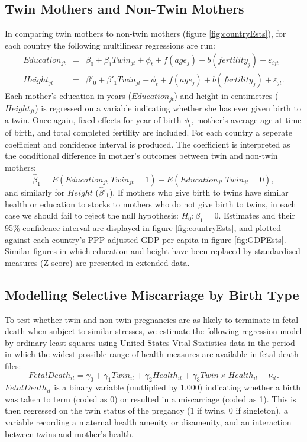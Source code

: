 \documentclass{nature}
\begin{document}
\begin{linenumbers}
\subsection{Twin Mothers and Non-Twin Mothers}
In comparing twin mothers to non-twin mothers (figure \ref{fig:countryEsts}), for each country the following multilinear regressions are run:
\begin{eqnarray}
  Education_{jt}&=&\beta_0 + \beta_1 Twin_{jt} + \phi_t + f(age_j) + b(fertility_j) + \varepsilon_{ijt} \\
  Height_{jt}&=&\beta'_0 + \beta'_1 Twin_{jt} + \phi_t + f(age_j) + b(fertility_j) + \varepsilon_{jt}.
\end{eqnarray}
Each mother's education in years ($Education_{jt}$) and height in centimetres ($Height_{jt}$) is regressed on a variable indicating whether she has ever given birth to a twin.  Once again, fixed effects for year of birth $\phi_t$, mother's average age at time of birth, and total completed fertility are included.  For each country a seperate coefficient and confidence interval is produced.  The coefficient is interpreted as the conditional difference in mother's outcomes between twin and non-twin mothers:
\[
\hat\beta_1 = E(Education_{jt}| Twin_{jt}=1) - E(Education_{jt}| Twin_{jt}=0),
\]
and similarly for $Height$ ($\hat\beta'_1$).  If mothers who give birth to twins have similar health or education to stocks to mothers who do not give birth to twins, in each case we should fail to reject the null hypothesis: $H_0: \beta_1=0$.  Estimates and their 95\% confidence interval are displayed in figure \ref{fig:countryEsts}, and plotted against each country's PPP adjusted GDP per capita in figure \ref{fig:GDPEsts}.  Similar figures in which education and height have been replaced by standardised measures (Z-score) are presented in extended data.

\subsection{Modelling Selective Miscarriage by Birth Type}
To test whether twin and non-twin pregnancies are as likely to terminate in fetal death when subject to similar stresses, we estimate the following regression model by ordinary least squares using United States Vital Statistics data in the period in which the widest possible range of health measures are available in fetal death files:
\begin{equation}
FetalDeath_{it} = \gamma_0 + \gamma_1 Twin_{it} + \gamma_2 Health_{it} + \gamma_3 Twin\times Health_{it} + \nu_{it}.
\end{equation}
$FetalDeath_{it}$ is a binary variable (mutliplied by 1,000) indicating whether a birth was taken to term (coded as 0) or resulted in a miscarriage (coded as 1).  This is then regressed on the twin status of the pregancy (1 if twins, 0 if singleton), a variable recording a maternal health amenity or disamenity, and an interaction between twins and mother's health.


\end{linenumbers}
\end{document}
